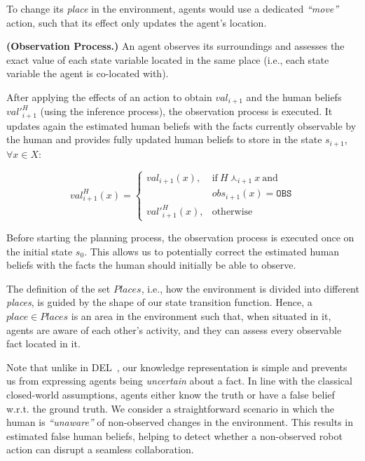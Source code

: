 {To change its \textit{place} in the environment, agents would use a dedicated \textit{``move''} action, such that its effect only updates the agent's location. 

\begin{definition} 
\label{def:new_obs}
    \textbf{(Observation Process.)} An agent observes its surroundings and assesses the exact value of each state variable located in the same place (i.e., each state variable the agent is co-located with).
\end{definition}

After applying the effects of an action to obtain $val_{i+1}$ and the human beliefs $val'^H_{i+1}$ (using the inference process), the observation process is executed. It updates again the estimated human beliefs with the facts currently observable by the human and provides fully updated human beliefs to store in the state $s_{i+1}$, $\forall x \in X$:

\begin{equation}
val^H_{i+1}(x) = \left\{ 
\begin{array}{ll}
val_{i+1}(x), & \mbox{if}~ H \curlywedge_{i+1} x ~\mbox{and}~ \\
    & obs_{i+1}(x) = \texttt{OBS}\\
val'^H_{i+1}(x), & \mbox{otherwise}
\end{array}\right.
\end{equation}

Before starting the planning process, the observation process is executed once on the initial state $s_0$. This allows us to potentially correct the estimated human beliefs with the facts the human should initially be able to observe. 

The definition of the set $Places$, i.e., how the environment is divided into different \textit{places}, is guided by the shape of our state transition function. Hence, a $place \in Places$ is an area in the environment such that, when situated in it, agents are aware of each other's activity, and they can assess every observable fact located in it. 

Note that unlike in DEL~\cite{KR2021-12}, our knowledge representation is simple and prevents us from expressing agents being \textit{uncertain} about a fact. 
In line with the classical closed-world assumptions, agents either know the truth or have a false belief w.r.t. the ground truth. 
We consider a straightforward scenario in which the human is \textit{``unaware''} of non-observed changes in the environment. 
This results in estimated false human beliefs, helping to detect whether a non-observed robot action can disrupt a seamless collaboration. 

}
